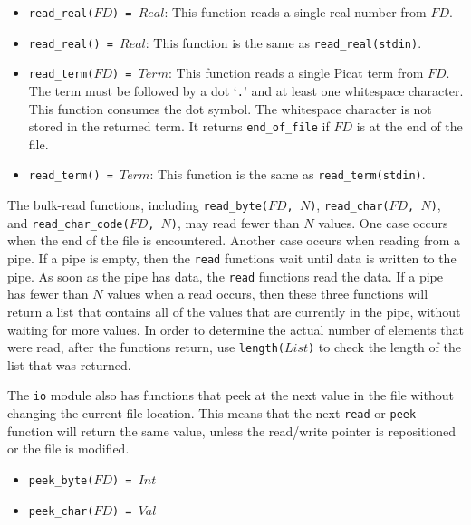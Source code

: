 \begin{itemize}
\item \texttt{read\_real($FD$) = $Real$}: This function reads a single real number from $FD$. 

\item \texttt{read\_real() = $Real$}: This function is the same as \texttt{read\_real(stdin)}.
\item \texttt{read\_term($FD$) = $Term$}: This function reads a single Picat term from $FD$.  The term must be followed by a dot  `\texttt{.}' and at least one whitespace character.  This function consumes the dot symbol.  The whitespace character is not stored in the returned term. It returns {\tt end\_of\_file} if $FD$ is at the end of the file.
\item \texttt{read\_term() = $Term$}: This function is the same as \texttt{read\_term(stdin)}.
\end{itemize}

The bulk-read functions, including \texttt{read\_byte($FD$, $N$)}, \texttt{read\_char($FD$, $N$)}, and \texttt{read\_char\_code($FD$, $N$)}, may read fewer than $N$ values.  One case occurs when the end of the file is encountered.  Another case occurs when reading from a pipe.  If a pipe is empty, then the \texttt{read} functions wait until data is written to the pipe.  As soon as the pipe has data, the \texttt{read} functions read the data.  If a pipe has fewer than $N$ values when a read occurs, then these three functions will return a list that contains all of the values that are currently in the pipe, without waiting for more values.  In order to determine the actual number of elements that were read, after the functions return, use \texttt{length($List$)} to check the length of the list that was returned.

The \texttt{io} module also has functions that peek at the next value in the file without changing the current file location.  This means that the next \texttt{read} or \texttt{peek} function will return the same value, unless the read/write pointer is repositioned or the file is modified.

\begin{itemize}
\item \texttt{peek\_byte($FD$) = $Int$}
\item \texttt{peek\_char($FD$) = $Val$}
\end{itemize}

